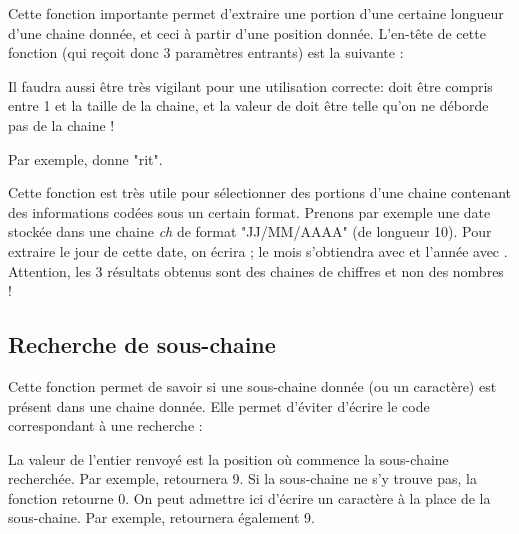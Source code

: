 		Cette fonction importante 
		permet d'extraire une portion 
		d'une certaine longueur d'une chaine donnée, 
		et ceci à partir d'une position donnée. 
		L'en-tête de cette fonction 
		(qui reçoit donc 3 paramètres entrants) est la suivante :

		\begin{center}
		\end{center}

		Il faudra aussi être très vigilant 
		pour une utilisation correcte: 
		 doit être compris entre 1 et la taille de la chaine, 
		et la valeur de  doit être telle 
		qu'on ne déborde pas de la chaine ! 

		Par exemple,  
		donne "rit".

		Cette fonction est très utile pour sélectionner 
		des portions d'une chaine 
		contenant des informations codées sous un certain format. 
		Prenons par exemple une date stockée dans une chaine \textit{ch} de format 
		"JJ/MM/AAAA" (de longueur 10). 
		Pour extraire le jour de cette date, 
		on écrira  ; 
		le mois s'obtiendra avec  
		et l'année avec . 
		Attention, les 3 résultats obtenus sont des chaines de chiffres 
		et non des nombres !

	\subsection{Recherche de sous-chaine}
	
		Cette fonction permet de savoir 
		si une sous-chaine donnée (ou un caractère) 
		est présent dans une chaine donnée. 
		Elle permet d'éviter d'écrire 
		le code correspondant à une recherche : 

		\begin{center}
		\end{center}

		La valeur de l'entier renvoyé est la position 
		où commence la sous-chaine recherchée. 
		Par exemple, 
		 retournera 9. 
		Si la sous-chaine ne s'y trouve pas, 
		la fonction retourne 0. 
		On peut admettre ici d'écrire un caractère à la place de la sous-chaine. 
		Par exemple, 
		retournera également 9. 
		
